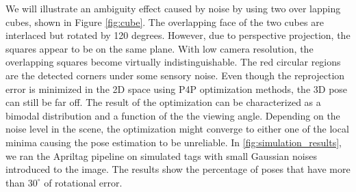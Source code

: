 We will illustrate an ambiguity effect caused by noise by using two over lapping cubes, shown in Figure \ref{fig:cube}. The overlapping face of the two cubes are interlaced but rotated by 120 degrees. However, due to perspective projection, the squares appear to be on the same plane. With low camera resolution, the overlapping squares become virtually indistinguishable. The red circular regions are the detected corners under some sensory noise. Even though the reprojection error is minimized in the 2D space using P4P optimization methods, the 3D pose can still be far off. The result of the optimization can be characterized as a bimodal distribution and a function of the the viewing angle. Depending on the noise level in the scene, the optimization might converge to either one of the local minima causing the pose estimation to be unreliable. In \ref{fig:simulation_results}, we ran the Apriltag pipeline on simulated tags with small Gaussian noises introduced to the image. The results show the percentage of poses that have more than $30^{\circ}$ of rotational error.